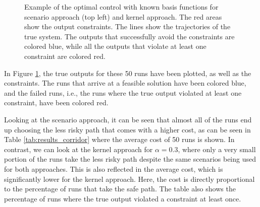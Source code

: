 \begin{figure}[t!]
{
 }
\caption{Example of the optimal control with known basis functions for scenario approach (top left) and kernel approach. The red areas show the output constraints. The lines show the trajectories of the true system. The outputs that successfully avoid the constraints are colored blue, while all the outputs that violate at least one constraint are colored red.}

\label{ScenarioKernelComparisonCorridor}
\end{figure}

In Figure \ref{ScenarioKernelComparisonCorridor}, the true outputs for these 50 runs have been plotted, as well as the constraints. The runs that arrive at a feasible solution have been colored blue, and the failed runs, i.e., the runs where the true output violated at least one constraint, have been colored red. 

Looking at the scenario approach, it can be seen that almost all of the runs end up choosing the less risky path that comes with a higher cost, as can be seen in Table \ref{tab:results_corridor} where the average cost of 50 runs is shown.  In contrast, we can look at the kernel approach for $\alpha = 0.3$, where only a very small portion of the runs take the less risky path despite the same scenarios being used for both approaches. This is also reflected in the average cost, which is significantly lower for the kernel approach. Here, the cost is directly proportional to the percentage of runs that take the safe path. The table also shows the percentage of runs where the true output violated a constraint at least once. 


